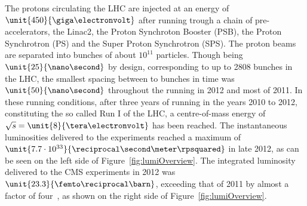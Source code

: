 The protons circulating the LHC are injected at an energy of $\unit{450}{\giga\electronvolt}$ after running trough a chain of pre-accelerators, the Linac2, the Proton Synchroton Booster (PSB), the Proton Synchrotron (PS) and the Super Proton Synchrotron (SPS). The proton beams are separated into bunches of about $10^{11}$ particles. Though being $\unit{25}{\nano\second}$ by design, corresponding to up to 2808 bunches in the LHC, the smallest spacing between to bunches in time was $\unit{50}{\nano\second}$ throughout the running in 2012 and most of 2011. In these running conditions, after three years of running in the years 2010 to 2012, constituting the so called Run I of the LHC, a centre-of-mass energy of $\sqrt{s} = \unit{8}{\tera\electronvolt}$ has been reached. The instantaneous luminosities delivered to the experiments reached a maximum of $\unit{7.7\cdot 10^{33}}{\reciprocal\second\meter\rpsquared}$ in late 2012, as can be seen on the left side of Figure~\ref{fig:lumiOverview}.  The integrated luminosity delivered to the CMS experiments in 2012 was $\unit{23.3}{\femto\reciprocal\barn}$, exceeding that of 2011 by almost a factor of four~\cite{LumiTwiki}, as shown on the right side of Figure~\ref{fig:lumiOverview}. 


